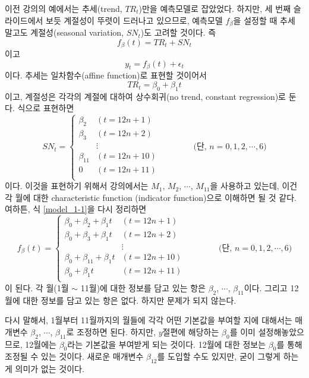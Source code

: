 \documentclass{article}
\begin{document}
이전 강의의 예에서는 추세(trend, $TR_t$)만을 예측모델로 잡았었다. 하지만, 세 번째 슬라이드에서 보듯 계절성이 뚜렷이 드러나고 있으므로, 예측모델 \(f_\beta\)을 설정할 때 추세 말고도 계절성(seasonal variation, $SN_t$)도 고려할 것이다.
즉
\begin{equation}\label{model_1-1}
f_\beta(t) = TR_t+SN_t
\end{equation}
이고
\[y_t=f_\beta(t)+\epsilon_t\]
이다.
추세는 일차함수(affine function)로 표현할 것이어서
\[TR_t = \beta_0+\beta_1 t\]
이고, 계절성은 각각의 계절에 대하여 상수회귀(no trend, constant regression)로 둔다.
식으로 표현하면
\[SN_t = \begin{cases}
\beta_2&(t=12n+1)\\
\beta_3&(t=12n+2)\\
&\vdots\\
\beta_{11}&(t=12n+10)\\
0&(t=12n+11)\\
\end{cases}\qquad\qquad(\text{단, \(n=0,1,2,\cdots,6)\)}\]
이다.
이것을 표현하기 위해서 강의에서는 \(M_1\), \(M_2\), \(\cdots\), \(M_{11}\)을 사용하고 있는데, 이건 각 월에 대한 characteristic function (indicator function)으로 이해하면 될 것 같다.
여하튼, 식 \eqref{model_1-1}을 다시 정리하면
\begin{equation}\label{model_1-2}
f_\beta(t) = \begin{cases}
\beta_0+\beta_2+\beta_1t&(t=12n+1)\\
\beta_0+\beta_3+\beta_1t&(t=12n+2)\\
&\vdots\\
\beta_0+\beta_{11}+\beta_1t&(t=12n+10)\\
\beta_0+\beta_1t&(t=12n+11)\\
\end{cases}\qquad\qquad(\text{단, \(n=0,1,2,\cdots,6)\)}
\end{equation}
이 된다.
각 월(1월 \(\sim\) 11월)에 대한 정보를 담고 있는 항은 \(\beta_2\), \(\cdots\), \(\beta_{11}\)이다.
그리고 12월에 대한 정보를 담고 있는 항은 없다.
하지만 문제가 되지 않는다.

다시 말해서, 1월부터 11월까지의 월들에 각각 어떤 기본값을 부여할 지에 대해서는 매개변수 \(\beta_2\), \(\cdots\), \(\beta_{11}\)로 조정하면 된다.
하지만, \(y\)절편에 해당하는 \(\beta_0\)를 이미 설정해놓았으므로, 12월에는 \(\beta_0\)라는 기본값을 부여받게 되는 것이다.
12월에 대한 정보는 \(\beta_0\)를 통해 조정될 수 있는 것이다.
새로운 매개변수 \(\beta_{12}\)를 도입할 수도 있지만, 굳이 그렇게 하는 게 의미가 없는 것이다.
\end{document}
